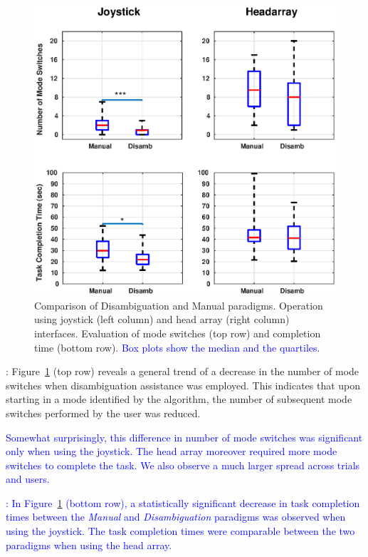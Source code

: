\documentclass[conference]{IEEEtran}
\begin{document}
\begin{figure}[t]
	\centering
	\includegraphics[width = 1.12\hsize ,center]{./figures/FINAL_BOX_PLOT_7.eps}
	\vspace{-0.7cm}
	\caption{Comparison of Disambiguation and Manual paradigms. Operation using joystick (left column) and head array (right column) interfaces. Evaluation of mode switches (top row) and completion time (bottom row). \textcolor{blue}{Box plots show the median and the quartiles}.}
	\label{DATAPLOT}
\end{figure}

\vspace{0.1cm}
: Figure~\ref{DATAPLOT} (top row) reveals a general trend of a decrease in the number of mode switches when disambiguation assistance was employed. This indicates that upon starting in a mode identified by the algorithm, the number of subsequent mode switches performed by the user was reduced.
 
\textcolor{blue}{Somewhat surprisingly, this difference in number of mode switches was significant only when using the joystick. The head array moreover required more mode switches to complete the task. We also observe a much larger spread across trials and users.}

\vspace{0.1cm}
\textcolor{blue}{: 
In Figure~\ref{DATAPLOT} (bottom row), a statistically significant decrease in task completion times between the \textit{Manual} and \textit{Disambiguation} paradigms was observed when using the joystick. The task completion times were comparable between the two paradigms when using the head array. }
\end{document}
